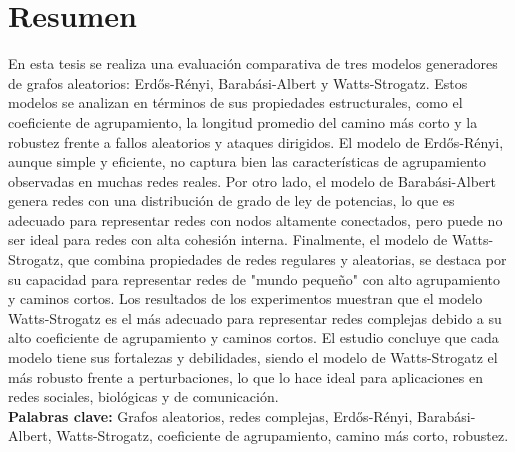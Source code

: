 \doublespacing
\chapter*{\centering \normalsize Resumen}
En esta tesis se realiza una evaluación comparativa de tres modelos generadores de grafos aleatorios: Erdős-Rényi, Barabási-Albert y Watts-Strogatz. 
Estos modelos se analizan en términos de sus propiedades estructurales, como el coeficiente de agrupamiento, la longitud promedio del camino más corto y la robustez frente 
a fallos aleatorios y ataques dirigidos. El modelo de Erdős-Rényi, aunque simple y eficiente, no captura bien las características de agrupamiento observadas en muchas redes reales. 
Por otro lado, el modelo de Barabási-Albert genera redes con una distribución de grado de ley de potencias, lo que es adecuado para representar redes con nodos altamente 
conectados, pero puede no ser ideal para redes con alta cohesión interna. Finalmente, el modelo de Watts-Strogatz, que combina propiedades de redes regulares y aleatorias, 
se destaca por su capacidad para representar redes de "mundo pequeño" con alto agrupamiento y caminos cortos. Los resultados de los experimentos muestran que el modelo 
Watts-Strogatz es el más adecuado para representar redes complejas debido a su alto coeficiente de agrupamiento y caminos cortos. El estudio concluye que cada modelo tiene 
sus fortalezas y debilidades, siendo el modelo de Watts-Strogatz el más robusto frente a perturbaciones, lo que lo hace ideal para aplicaciones en redes sociales, biológicas y de comunicación.\\
\textbf{Palabras clave:} Grafos aleatorios, redes complejas, Erdős-Rényi, Barabási-Albert, Watts-Strogatz, coeficiente de agrupamiento, camino más corto, robustez.


